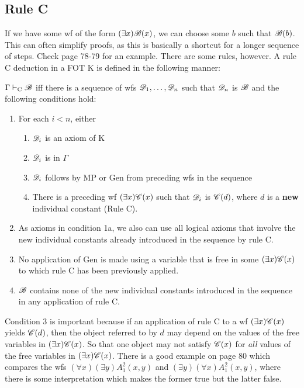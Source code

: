 \subsection{Rule C}

If we have some wf of the form $(\exists x) \mathscr{B}(x)$, we can choose some $b$ such that $\mathscr{B}(b)$. This can often simplify proofs, as this is basically a shortcut for a longer sequence of steps. Check page 78-79 for an example. There are some rules, however. A rule C deduction in a FOT K is defined in the following manner:

$\Gamma \vdash_\text{C} \mathscr{B}$ iff there is a sequence of wfs $\mathscr{D}_1, \dots, \mathscr{D}_n$ such that $\mathscr{D}_n$ is $\mathscr{B}$ and the following conditions hold:

\begin{enumerate}
    \item For each $i<n$, either
    \begin{enumerate} [label = \alph*.]
        \item $\mathscr{D}_i$ is an axiom of K
        \item $\mathscr{D}_i$ is in $\Gamma$
        \item $\mathscr{D}_i$ follows by MP or Gen from preceding wfs in the sequence
        \item There is a preceding wf $(\exists x) \mathscr{C}(x)$ such that $\mathscr{D}_i$ is $\mathscr{C}(d)$, where $d$ is a \textbf{new} individual constant (Rule C).
    \end{enumerate}
    \item As axioms in condition 1a, we also can use all logical axioms that involve the new individual constants already introduced in the sequence by rule C.
    \item No application of Gen is made using a variable that is free in some $(\exists x) \mathscr{C}(x)$ to which rule C has been previously applied.
    \item $\mathscr{B}$ contains none of the new individual constants introduced in the sequence in any application of rule C.
\end{enumerate}

Condition 3 is important because if an application of rule C to a wf $(\exists x)\mathscr{C}(x)$ 
yields $\mathscr{C}(d)$, then the object referred to by $d$ may depend on the values of the free variables in $(\exists x)\mathscr{C}(x)$. So that one object may not satisfy $\mathscr{C}(x)$ for \textit{all} values of the free variables in $(\exists x)\mathscr{C}(x)$. There is a good example on page 80 which compares the wfs $(\forall x)(\exists y) A_1^2(x,y)$ and $(\exists y)(\forall x) A_1^2(x,y)$, where there is some interpretation which makes the former true but the latter false.

